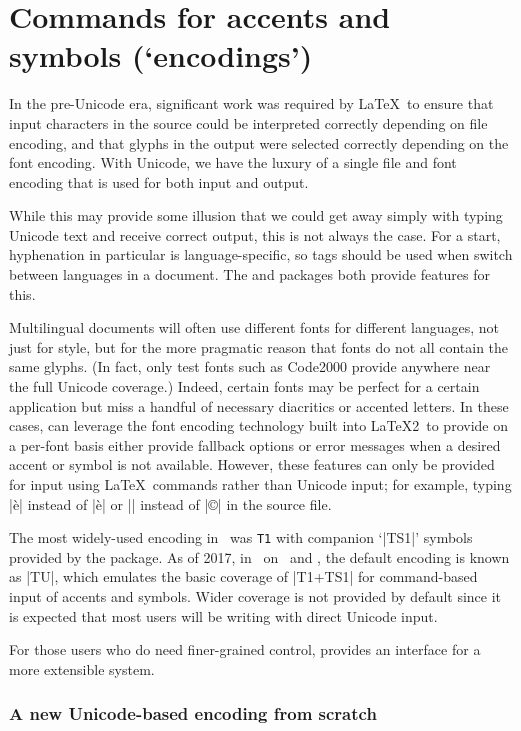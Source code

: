 \documentclass[a4paper]{ltxdoc}
\begin{document}
\part{Commands for accents and symbols (`encodings')}

In the pre-Unicode era, significant work was required by \LaTeX\ to ensure that
input characters in the source could be interpreted correctly depending on file encoding,
and that glyphs in the output were selected correctly depending on the font encoding.
With Unicode, we have the luxury of a single file and font encoding that is used for both input
and output.

While this may provide some illusion that we could get away simply with typing
Unicode text and receive correct output, this is not always the case.
For a start, hyphenation in particular is language-specific, so tags should be used
when switch between languages in a document.
The  and  packages both provide features for this.

Multilingual documents will often use different fonts for different languages,
not just for style, but for the more pragmatic reason that fonts do not all contain
the same glyphs. (In fact, only test fonts such as Code2000 provide
anywhere near the full Unicode coverage.)
Indeed, certain fonts may be perfect for a certain application but miss a handful
of necessary diacritics or accented letters.
In these cases,  can leverage the font encoding technology built
into \LaTeX2\ to provide on a per-font basis either provide fallback options or
error messages when a desired accent or symbol is not available.
However, these features can only be provided for input using \LaTeX\ commands rather
than Unicode input; for example, typing |\`e| instead of |è| or |\textcopyright|
instead of |©| in the source file.

The most widely-used encoding in \LaTeXe\ was \texttt{T1} with companion `|TS1|' symbols
provided by the  package.
As of 2017, in \LaTeXe\ on \XeTeX\ and \LuaTeX, the default encoding is known as |TU|,
which emulates the basic coverage of |T1+TS1| for command-based input of accents and symbols.
Wider coverage is not provided by default since it is expected that most users
will be writing with direct Unicode input.

For those users who do need finer-grained control,  provides an
interface for a more extensible system.


\section{A new Unicode-based encoding from scratch}
\end{document}
